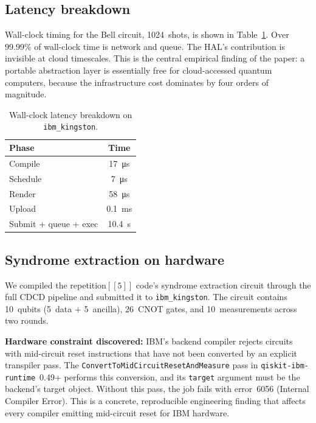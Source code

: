 \documentclass[aps,prApplied,twocolumn,superscriptaddress,floatfix]{revtex4-2}
\begin{document}
\subsection{Latency breakdown}

Wall-clock timing for the Bell circuit, \num{1024}~shots, is shown in
Table~\ref{tab:latency}. Over \num{99.99}\% of wall-clock time is
network and queue. The HAL's contribution is invisible at cloud
timescales. This is the central empirical finding of the paper: a
portable abstraction layer is essentially free for cloud-accessed
quantum computers, because the infrastructure cost dominates by four
orders of magnitude.

\begin{table}[b]
\caption{\label{tab:latency}Wall-clock latency breakdown on
\texttt{ibm\_kingston}.}
\begin{ruledtabular}
\begin{tabular}{lc}
Phase & Time \\
\hline
Compile               & \SI{17}{\micro\second} \\
Schedule              & \SI{7}{\micro\second}  \\
Render                & \SI{58}{\micro\second} \\
Upload                & \SI{0.1}{\milli\second} \\
Submit + queue + exec & \SI{10.4}{\second} \\
\end{tabular}
\end{ruledtabular}
\end{table}

\subsection{Syndrome extraction on hardware}

We compiled the repetition$[[5]]$ code's syndrome extraction circuit
through the full CDCD pipeline and submitted it to
\texttt{ibm\_kingston}. The circuit contains 10~qubits (5~data
$+$ 5~ancilla), 26~CNOT gates, and 10~measurements across two rounds.

\textbf{Hardware constraint discovered:} IBM's backend compiler rejects
circuits with mid-circuit reset instructions that have not been converted
by an explicit transpiler pass. The
\texttt{ConvertToMidCircuitResetAndMeasure} pass in
\texttt{qiskit-ibm-runtime}~0.49+ performs this conversion, and its
\texttt{target} argument must be the backend's target object. Without
this pass, the job fails with error~6056 (Internal Compiler Error). This
is a concrete, reproducible engineering finding that affects every
compiler emitting mid-circuit reset for IBM hardware.
\end{document}
